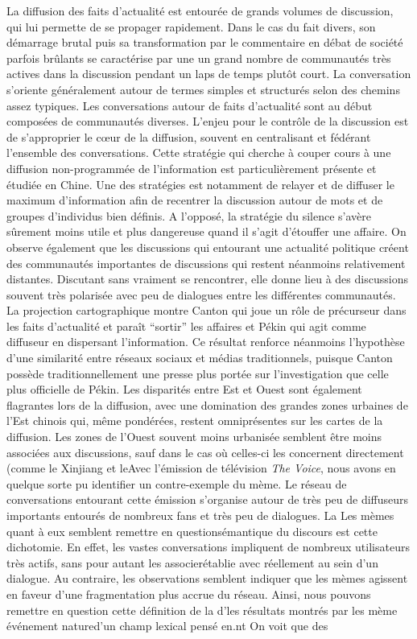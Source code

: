 La diffusion des faits d{\textquoteright}actualité est entourée de grands volumes de discussion, qui lui permette de se propager rapidement. Dans le cas du fait divers, son démarrage brutal puis sa transformation par le commentaire en débat de société parfois brûlants se caractérise par une un grand nombre de communautés très actives dans la discussion pendant un laps de temps plutôt court. La conversation s'oriente généralement autour de termes simples et structurés selon des chemins assez typiques. Les conversations autour de faits d'actualité sont au début composées de communautés diverses. L'enjeu pour le contrôle de la discussion est de s'approprier le cœur de la diffusion, souvent en centralisant et fédérant l'ensemble des conversations. Cette stratégie qui cherche à couper cours à une diffusion non-programmée de l'information est particulièrement présente et étudiée en Chine. Une des stratégies est notamment de relayer et de diffuser le maximum d'information afin de recentrer la discussion autour de mots et de groupes d{\textquoteright}individus bien définis. A l'opposé, la stratégie du silence s'avère sûrement moins utile et plus dangereuse quand il s'agit d'étouffer une affaire. On observe également que les discussions qui entourant une actualité politique créent des communautés importantes de discussions qui restent néanmoins relativement distantes. Discutant sans vraiment se rencontrer, elle donne lieu à des discussions souvent très polarisée avec peu de dialogues entre les différentes communautés. La projection cartographique montre Canton qui joue un r\^ole de précurseur dans les faits d{\textquoteright}actualité et para\^it {\textquotedblleft}sortir{\textquotedblright} les affaires et Pékin qui agit comme diffuseur en dispersant l{\textquoteright}information. Ce résultat renforce néanmoins l{\textquoteright}hypothèse d{\textquoteright}une similarité entre réseaux sociaux et médias traditionnels, puisque Canton possède traditionnellement une presse plus portée sur l'investigation que celle plus officielle de Pékin. Les disparités entre Est et Ouest sont également flagrantes lors de la diffusion, avec une domination des grandes zones urbaines de l{\textquoteright}Est chinois qui, même pondérées, restent omniprésentes sur les cartes de la diffusion. Les zones de l{\textquoteright}Ouest souvent moins urbanisée semblent être moins associées aux discussions, sauf dans le cas où celles-ci les concernent directement (comme le Xinjiang et leAvec l{\textquoteright}émission de télévision \textit{The Voice}, nous avons en quelque sorte pu identifier un contre-exemple du mème. Le réseau de conversations entourant cette émission s'organise autour de très peu de diffuseurs importants entourés de nombreux fans et très peu de dialogues. La Les mèmes quant à eux semblent remettre en questionsémantique du discours est  cette dichotomie. En effet, les vastes conversations impliquent de nombreux utilisateurs très actifs, sans pour autant les associerétablie avec  réellement au sein d'un dialogue. Au contraire, les observations semblent indiquer que les mèmes agissent en faveur d'une fragmentation plus accrue du réseau. Ainsi, nous pouvons remettre en question cette définition de la  d'les résultats montrés par les mème événement natured'un champ lexical pensé en.nt On voit que des 